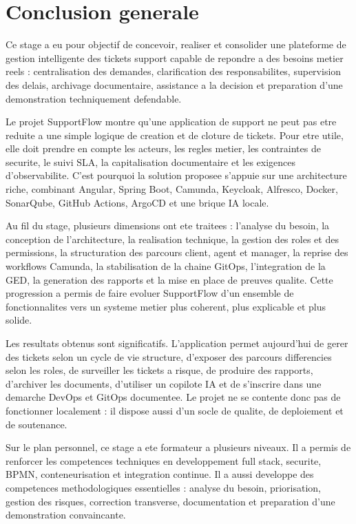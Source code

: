 \chapter{Conclusion generale}

Ce stage a eu pour objectif de concevoir, realiser et consolider une plateforme de gestion intelligente des tickets support capable de repondre a des besoins metier reels : centralisation des demandes, clarification des responsabilites, supervision des delais, archivage documentaire, assistance a la decision et preparation d'une demonstration techniquement defendable.

Le projet SupportFlow montre qu'une application de support ne peut pas etre reduite a une simple logique de creation et de cloture de tickets. Pour etre utile, elle doit prendre en compte les acteurs, les regles metier, les contraintes de securite, le suivi SLA, la capitalisation documentaire et les exigences d'observabilite. C'est pourquoi la solution proposee s'appuie sur une architecture riche, combinant Angular, Spring Boot, Camunda, Keycloak, Alfresco, Docker, SonarQube, GitHub Actions, ArgoCD et une brique IA locale.

Au fil du stage, plusieurs dimensions ont ete traitees : l'analyse du besoin, la conception de l'architecture, la realisation technique, la gestion des roles et des permissions, la structuration des parcours client, agent et manager, la reprise des workflows Camunda, la stabilisation de la chaine GitOps, l'integration de la GED, la generation des rapports et la mise en place de preuves qualite. Cette progression a permis de faire evoluer SupportFlow d'un ensemble de fonctionnalites vers un systeme metier plus coherent, plus explicable et plus solide.

Les resultats obtenus sont significatifs. L'application permet aujourd'hui de gerer des tickets selon un cycle de vie structure, d'exposer des parcours differencies selon les roles, de surveiller les tickets a risque, de produire des rapports, d'archiver les documents, d'utiliser un copilote IA et de s'inscrire dans une demarche DevOps et GitOps documentee. Le projet ne se contente donc pas de fonctionner localement : il dispose aussi d'un socle de qualite, de deploiement et de soutenance.

Sur le plan personnel, ce stage a ete formateur a plusieurs niveaux. Il a permis de renforcer les competences techniques en developpement full stack, securite, BPMN, conteneurisation et integration continue. Il a aussi developpe des competences methodologiques essentielles : analyse du besoin, priorisation, gestion des risques, correction transverse, documentation et preparation d'une demonstration convaincante.

